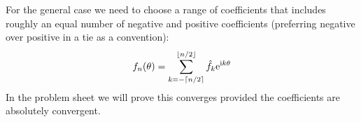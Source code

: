 For the general case we need to choose a range of coefficients that includes roughly an equal number of negative and positive coefficients (preferring negative over positive in a tie as a convention):
\[
f_n(\ensuremath{\theta}) = \ensuremath{\sum}_{k=-\ensuremath{\lceil}n/2\ensuremath{\rceil}}^{\ensuremath{\lfloor}n/2\ensuremath{\rfloor}} \hat f_k {\rm e}^{{\rm i} k \ensuremath{\theta}}
\]
In the problem sheet we will prove this converges provided the coefficients are absolutely convergent.



